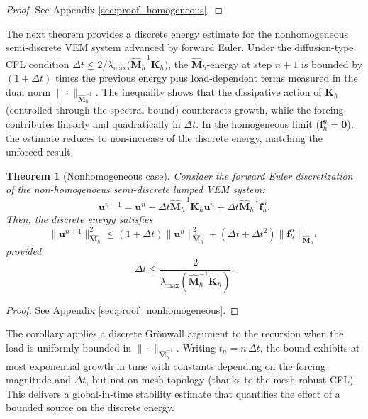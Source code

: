 \documentclass{article}
\newtheorem{theo}{Theorem}[section]
\renewcommand{\u}{\mathbf{u}}
\newcommand{\K}{\mathbf{K}_h}
\newcommand{\M}{\hat{\mathbf{M}}_h}
\begin{document}
\begin{proof}
    See Appendix \ref{sec:proof_homogeneous}.
\end{proof}

The next theorem provides a discrete energy estimate for the nonhomogeneous semi-discrete VEM system advanced by forward Euler. Under the diffusion-type CFL condition $\Delta t \le 2/\lambda_{\max}\!\big(\M^{-1}\K\big)$, the $\M$-energy at step $n+1$ is bounded by $(1+\Delta t)$ times the previous energy plus load-dependent terms measured in the dual norm $\|\cdot\|_{\M^{-1}}$. The inequality shows that the dissipative action of $\K$ (controlled through the spectral bound) counteracts growth, while the forcing contributes linearly and quadratically in $\Delta t$. In the homogeneous limit ($\mathbf{f}_h^n=\mathbf{0}$), the estimate reduces to non-increase of the discrete energy, matching the unforced result.

\begin{theo}[Nonhomogeneous case]\label{theo:non_homogeneous_case}
    Consider the forward Euler discretization of the non-homogenoeus semi-discrete lumped VEM system:
    \begin{equation}
    \nonumber
        \u^{n+1}  = \u^n - \Delta t \M^{-1}\K \u^n + \Delta t \M^{-1} \mathbf{f}_h^n.
    \end{equation}
    Then, the discrete energy satisfies
    \begin{equation}
    \nonumber
        \| \u^{n+1} \|^2_{\M} \leq (1 + \Delta t) \| \u^n \|^2_{\M} + (\Delta t + \Delta t^2)\|\mathbf{f}_h^n\|_{\M^{-1}}
    \end{equation}
    provided
    \begin{equation}
    \nonumber
        \Delta t \leq \frac{2}{\lambda_{\max}\left(\M^{-1}\K\right)}.
    \end{equation}
\end{theo}

\begin{proof}
    See Appendix \ref{sec:proof_nonhomogeneous}.
\end{proof}

The corollary applies a discrete Grönwall argument to the recursion when the load is uniformly bounded in $\|\cdot\|_{\M^{-1}}$. Writing $t_n=n\,\Delta t$, the bound exhibits at most exponential growth in time with constants depending on the forcing magnitude and $\Delta t$, but not on mesh topology (thanks to the mesh-robust CFL). This delivers a global-in-time stability estimate that quantifies the effect of a bounded source on the discrete energy.
\end{document}
